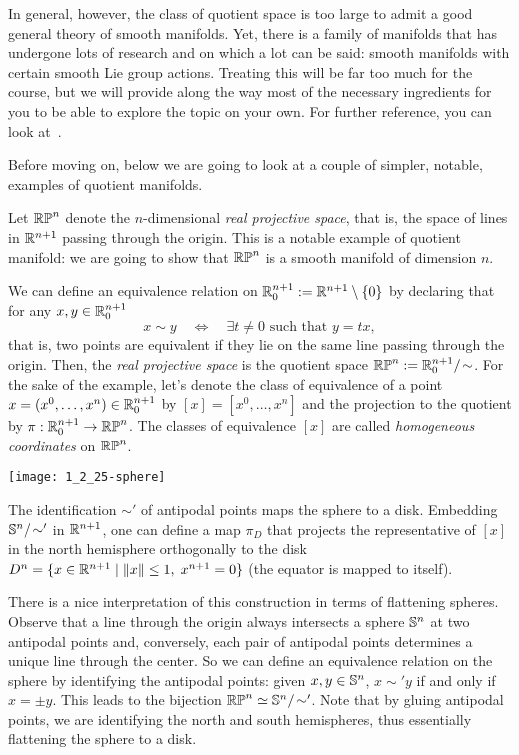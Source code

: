In general, however, the class of quotient space is too large to admit a good general theory of smooth manifolds.
Yet, there is a family of manifolds that has undergone lots of research and on which a lot can be said: smooth manifolds with certain smooth Lie group actions.
Treating this will be far too much for the course, but we will provide along the way most of the necessary ingredients for you to be able to explore the topic on your own.
For further reference, you can look at~\cite[Chapter 21]{book:lee}.

Before moving on, below we are going to look at a couple of simpler, notable, examples of quotient manifolds.

\begin{example}
	Let $\mathbb{RP}^n$ denote the $n$-dimensional \emph{real projective space}, that is, the space of lines in $\mathbb{R}^{n+1}$ passing through the origin.
	This is a notable example of quotient manifold: we are going to show that $\mathbb{RP}^n$ is a smooth manifold of dimension $n$.

	We can define an equivalence relation on $\mathbb{R}^{n+1}_0:=\mathbb{R}^{n+1}\setminus\{0\}$ by declaring that for any $x,y\in \mathbb{R}^{n+1}_0$
	\begin{equation}
		x\sim y \quad\Longleftrightarrow\quad \exists t\neq 0 \mbox{ such that } y=tx,
	\end{equation}
	that is, two points are equivalent if they lie on the same line passing through the origin.
	Then, the \emph{real projective space} is the quotient space $\mathbb{RP}^n := \mathbb{R}^{n+1}_0/\!\sim$.
	For the sake of the example, let's denote the class of equivalence of a point $x=(x^0,\ldots,x^n)\in\mathbb{R}^{n+1}_0$ by $[x]=[x^0,\ldots,x^n]$ and the projection to the quotient by $\pi:\mathbb{R}^{n+1}_0\to\mathbb{RP}^n$.
	The classes of equivalence $[x]$ are called \emph{homogeneous coordinates} on $\mathbb{RP}^n$.

	\begin{marginfigure}
		\texttt{[image: 1\_2\_25-sphere]}
		\caption{The identification $\sim'$ of antipodal points maps the sphere to a disk. Embedding $\mathbb{S}^n/\!\sim'$ in $\mathbb{R}^{n+1}$, one can define a map $\pi_D$ that projects the representative of $[x]$ in the north hemisphere orthogonally to the disk $D^n = \{x\in\mathbb{R}^{n+1} \mid \|x\|\leq 1, \; x^{n+1}=0\}$ (the equator is mapped to itself). }
	\end{marginfigure}
	There is a nice interpretation of this construction in terms of flattening spheres.
	Observe that a line through the origin always intersects a sphere $\mathbb{S}^n$ at two antipodal points and, conversely, each pair of antipodal points determines a unique line through the center.
	So we can define an equivalence relation on the sphere by identifying the antipodal points: given $x,y\in\mathbb{S}^n$, $x\sim' y$ if and only if $x = \pm y$.
	This leads to the bijection $\mathbb{RP}^n \simeq \mathbb{S}^n/\!\sim'$.
	Note that by gluing antipodal points, we are identifying the north and south hemispheres, thus essentially flattening the sphere to a disk.


\end{example}
